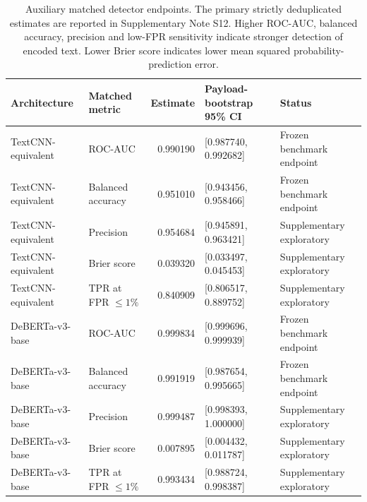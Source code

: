 \documentclass[fleqn,10pt]{wlscirep}
\begin{document}
\begin{table}[H]
\centering
\small
\begin{tabularx}{\textwidth}{L{0.24\textwidth}L{0.17\textwidth}r L{0.25\textwidth}Y}
\toprule
Architecture & Matched metric & Estimate & Payload-bootstrap 95\% CI & Status \\
\midrule
TextCNN-equivalent & ROC-AUC & 0.990190 & [0.987740, 0.992682] & Frozen benchmark endpoint \\
TextCNN-equivalent & Balanced accuracy & 0.951010 & [0.943456, 0.958466] & Frozen benchmark endpoint \\
TextCNN-equivalent & Precision & 0.954684 & [0.945891, 0.963421] & Supplementary exploratory \\
TextCNN-equivalent & Brier score & 0.039320 & [0.033497, 0.045453] & Supplementary exploratory \\
TextCNN-equivalent & TPR at FPR \(\leq1\%\) & 0.840909 & [0.806517, 0.889752] & Supplementary exploratory \\
DeBERTa-v3-base & ROC-AUC & 0.999834 & [0.999696, 0.999939] & Frozen benchmark endpoint \\
DeBERTa-v3-base & Balanced accuracy & 0.991919 & [0.987654, 0.995665] & Frozen benchmark endpoint \\
DeBERTa-v3-base & Precision & 0.999487 & [0.998393, 1.000000] & Supplementary exploratory \\
DeBERTa-v3-base & Brier score & 0.007895 & [0.004432, 0.011787] & Supplementary exploratory \\
DeBERTa-v3-base & TPR at FPR \(\leq1\%\) & 0.993434 & [0.988724, 0.998387] & Supplementary exploratory \\
\bottomrule
\end{tabularx}
\caption{\label{tab:detector-matched} Auxiliary matched detector endpoints. The primary strictly deduplicated estimates are reported in Supplementary Note S12.   Higher ROC-AUC, balanced accuracy, precision and low-FPR sensitivity indicate stronger detection of encoded text. Lower Brier score indicates lower mean squared probability-prediction error.}
\end{table}
\end{document}
